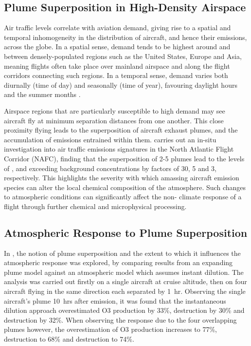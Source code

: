 \subsection{Plume Superposition in High-Density Airspace}
Air traffic levels correlate with aviation demand, giving rise to a spatial and temporal inhomogeneity in the distribution of aircraft, and hence their emissions, across the globe. In a spatial sense, demand tends to be highest around and between densely-populated regions such as the United States, Europe and Asia, meaning flights often take place over mainland airspace and along the flight corridors connecting such regions. In a temporal sense, demand varies both diurnally (time of day) and seasonally (time of year), favouring daylight hours and the summer months \cite{Olsen2013}.

Airspace regions that are particularly susceptible to high demand may see aircraft fly at minimum separation distances from one another. This close proximity flying leads to the superposition of aircraft exhaust plumes, and the accumulation of emissions entrained within them. \cite{Schlager1997} carries out an in-situ investigation into air traffic emissions signatures in the North Atlantic Flight Corridor (NAFC), finding that the superposition of 2-5 plumes lead to the levels of ,  and  exceeding background concentrations by factors of 30, 5 and 3, respectively. This highlights the severity with which amassing aircraft emission species can alter the local chemical composition of the atmosphere. Such changes to atmospheric conditions can significantly affect the non- climate response of a flight through further chemical and microphysical processing.

\subsection{Atmospheric Response to Plume Superposition}
In \cite{Cameron2013}, the notion of plume superposition and the extent to which it influences the atmospheric response was explored, by comparing results from an expanding plume model against an atmospheric model which assumes instant dilution. The analysis was carried out firstly on a single aircraft at cruise altitude, then on four aircraft flying in the same direction each separated by 1~hr. Observing the single aircraft's plume 10~hrs after emission, it was found that the instantaneous dilution approach overestimated O3 production by 33\%,  destruction by 30\% and  destruction by 32\%. When observing the response due to the four overlapping plumes however, the overestimation of O3 production increases to 77\%,  destruction to 68\% and  destruction to 74\%. 

